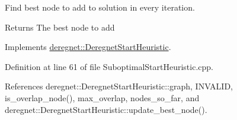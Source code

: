Find best node to add to solution in every iteration. 

\begin{DoxyReturn}{Returns}
The best node to add 
\end{DoxyReturn}


Implements \hyperlink{classderegnet_1_1DeregnetStartHeuristic_a372be86d0fb8ac94bd926a1f4d09e102}{deregnet\+::\+Deregnet\+Start\+Heuristic}.



Definition at line 61 of file Suboptimal\+Start\+Heuristic.\+cpp.



References deregnet\+::\+Deregnet\+Start\+Heuristic\+::graph, I\+N\+V\+A\+L\+ID, is\+\_\+overlap\+\_\+node(), max\+\_\+overlap, nodes\+\_\+so\+\_\+far, and deregnet\+::\+Deregnet\+Start\+Heuristic\+::update\+\_\+best\+\_\+node().


